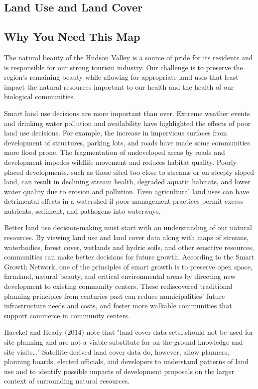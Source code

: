 \subsection{Land Use and Land Cover}\label{subsec:landuse}
\subsection*{Why You Need This Map}
The natural beauty of the Hudson Valley is a source of pride for its residents 
and is responsible for our strong tourism industry. Our challenge is to preserve 
the region’s remaining beauty while allowing for appropriate land uses that 
least impact the natural resources important to our health and the health of our 
biological communities.
\par
Smart land use decisions are more important than ever. Extreme weather events 
and drinking water pollution and availability have highlighted the effects of 
poor land use decisions. For example, the increase in impervious surfaces from 
development of structures, parking lots, and roads have made some communities 
more flood prone. The fragmentation of undeveloped areas by roads and 
development impedes wildlife movement and reduces habitat quality. Poorly 
placed developments, such as those sited too close to streams or on steeply 
sloped land, can result in declining stream health, degraded aquatic habitats, 
and lower water quality due to erosion and pollution. Even agricultural land 
uses can have detrimental effects in a watershed if poor management practices 
permit excess nutrients, sediment, and pathogens into waterways.
\par
Better land use decision-making must start with an understanding of our natural 
resources. By viewing land use and land cover data along with maps of streams, 
waterbodies, forest cover, wetlands and hydric soils, and other sensitive 
resources, communities can make better decisions for future growth. According to 
the Smart Growth Network, one of the principles of smart growth is to preserve 
open space, farmland, natural beauty, and critical environmental areas by 
directing new development to existing community centers. These rediscovered 
traditional planning principles from centuries past can reduce municipalities’ 
future infrastructure needs and costs, and foster more walkable communities that 
support commerce in community centers.
\par
Haeckel and Heady (2014) note that "land cover data sets\ldots should not be 
used for site planning and are not a viable substitute for on-the-ground 
knowledge and site visits\ldots" Satellite-derived land cover data do, however, 
allow planners, planning boards, elected officials, and developers to understand 
patterns of land use and to identify possible impacts of development proposals 
on the larger context of surrounding natural resources.

